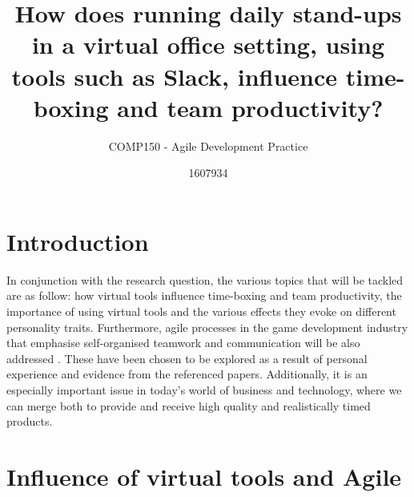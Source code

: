 \documentclass{scrartcl}
\title{How does running daily stand-ups in a virtual office setting, using tools such as Slack, influence time-boxing and team productivity?}
\subtitle{COMP150 - Agile Development Practice}
\author{1607934}
\begin{document}
\maketitle


\section{Introduction}

In conjunction with the research question, the various topics that will be tackled are as follow: how virtual tools influence time-boxing and team productivity, the importance of using virtual tools and the various effects they evoke on different personality traits. Furthermore, agile processes in the game development industry that emphasise self-organised teamwork and communication will be also addressed \cite{Manifesto}. These have been chosen to be explored as a result of personal experience and evidence from the referenced papers. Additionally, it is an especially important issue in today's world of business and technology, where we can merge both to provide and receive high quality and realistically timed products.


\section{Influence of virtual tools and Agile}
\end{document}

